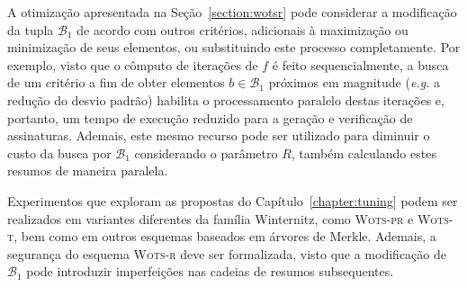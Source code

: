 \documentclass{ufsctex/ufsctex}
\newcommand{\bone}{\mathcal{B}_{1}}
\newcommand{\wotsprf}{\textsc{Wots-pr}}
\newcommand{\wotst}{\textsc{Wots-t}}
\newcommand{\wotsr}{\textsc{Wots-r}}
\begin{document}
A otimização apresentada na Seção~\ref{section:wotsr} pode considerar a
modificação da tupla $\bone{}$ de acordo com outros critérios, adicionais à
maximização ou minimização de seus elementos, ou substituindo este processo
completamente. Por exemplo, visto que o cômputo de iterações de $f$ é feito
sequencialmente, a busca de um critério a fim de obter elementos $b \in
\bone{}$ próximos em magnitude (\emph{e.g.} a redução do desvio padrão)
habilita o processamento paralelo destas iterações e, portanto, um tempo de
execução reduzido para a geração e verificação de assinaturas. Ademais, este
mesmo recurso pode ser utilizado para diminuir o custo da busca por $\bone{}$
considerando o parâmetro $R$, também calculando estes resumos de maneira
paralela.

Experimentos que exploram as propostas do Capítulo~\ref{chapter:tuning} podem
ser realizados em variantes diferentes da família Winternitz, como \wotsprf{} e
\wotst{}, bem como em outros esquemas baseados em árvores de Merkle. Ademais, a
segurança do esquema \wotsr{} deve ser formalizada, visto que a modificação de
$\bone{}$ pode introduzir imperfeições nas cadeias de resumos subsequentes.



\end{document}
